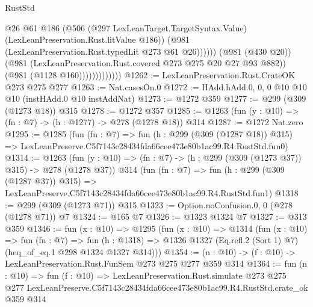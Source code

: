 \begin{lexlean}{RustStd}
\begin{coremodule}
                                  @26
                                  @61
                                  @186
                                  (@506
                                    (@297 LexLeanTarget.TargetSyntax.Value)
                                    (LexLeanPreservation.Rust.litValue @186))
                                  (@981 (LexLeanPreservation.Rust.typedLit @273 @61 @26))))))
                          (@981 (@430 @20))
                          (@981 (LexLeanPreservation.Rust.covered @273 @275 @20 @27 @93 @882))
                          (@981 (@1128 @160)))))))))))))
@1262 := LexLeanPreservation.Rust.CrateOK @273 @275 @277
@1263 := Nat.casesOn.{0}
@1272 := HAdd.hAdd.{0, 0, 0} @10 @10 @10 (instHAdd.{0} @10 instAddNat)
@1273 := @1272 @359
@1277 := @299 (@309 (@1273 @18)) @315
@1278 := @1272 @357
@1285 := @1263 (fun (y : @10) => (fn : @7) -> (h : @1277) -> @278 (@1278 @18)) @314
@1287 := @1272 Nat.zero
@1295 := @1285
    (fun (fn : @7) =>
    fun (h : @299 (@309 (@1287 @18)) @315) =>
    LexLeanPreserve.C5f7143c28434fda66cee473e80b1ac99.R4.RustStd.fun0)
@1314 := @1263
    (fun (y : @10) => (fn : @7) -> (h : @299 (@309 (@1273 @37)) @315) -> @278 (@1278 @37))
    @314
    (fun (fn : @7) =>
    fun (h : @299 (@309 (@1287 @37)) @315) =>
    LexLeanPreserve.C5f7143c28434fda66cee473e80b1ac99.R4.RustStd.fun1)
@1318 := @299 (@309 (@1273 @71)) @315
@1323 := Option.noConfusion.{0, 0} (@278 (@1278 @71)) @7
@1324 := @165 @7
@1326 := @1323 @1324 @7
@1327 := @313 @359
@1346 := fun (x : @10) =>
  @1295
    (fun (x : @10) =>
    @1314
      (fun (x : @10) =>
      fun (fn : @7) =>
      fun (h : @1318) =>
      @1326 @1327 (Eq.refl.{2} (Sort 1) @7) (heq_of_eq.{1} @298 @1324 @1327 @314)))
@1354 := (n : @10) -> (f : @10) -> LexLeanPreservation.Rust.FunSem @273 @275 @277 @359 @314
@1364 := fun (n : @10) =>
  fun (f : @10) =>
  LexLeanPreservation.Rust.simulate
    @273
    @275
    @277
    LexLeanPreserve.C5f7143c28434fda66cee473e80b1ac99.R4.RustStd.crate_ok
    @359
    @314
\end{coremodule}
\end{lexlean}

